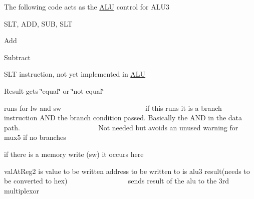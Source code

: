 The following code acts as the \mbox{\hyperlink{class_a_l_u}{A\+LU}} control for A\+L\+U3

S\+LT, A\+DD, S\+UB, S\+LT

Add

Subtract

S\+LT instruction, not yet implemented in \mbox{\hyperlink{class_a_l_u}{A\+LU}}

Result gets \char`\"{}equal\char`\"{} or \char`\"{}not equal\char`\"{}

runs for lw and sw ~\newline
~\newline
~\newline
~\newline
~\newline
~\newline
~\newline
~\newline
~\newline
~\newline
~\newline
~\newline
~\newline
~\newline
 if this runs it is a branch instruction A\+ND the branch condition passed. Basically the A\+ND in the data path. ~\newline
~\newline
~\newline
~\newline
~\newline
~\newline
~\newline
~\newline
~\newline
~\newline
~\newline
~\newline
~\newline
 Not needed but avoids an unused warning for mux5 if no branches

if there is a memory write (sw) it occurs here

val\+At\+Reg2 is value to be written address to be written to is alu3 result(needs to be converted to hex) ~\newline
~\newline
~\newline
~\newline
~\newline
~\newline
~\newline
~\newline
~\newline
~\newline
 sends result of the alu to the 3rd multiplexor

